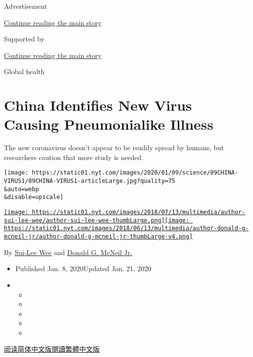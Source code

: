 Advertisement

\protect\hyperlink{after-top}{Continue reading the main story}

Supported by

\protect\hyperlink{after-sponsor}{Continue reading the main story}

Global health

\hypertarget{china-identifies-new-virus-causing-pneumonialike-illness}{%
\section{China Identifies New Virus Causing Pneumonialike
Illness}\label{china-identifies-new-virus-causing-pneumonialike-illness}}

The new coronavirus doesn't appear to be readily spread by humans, but
researchers caution that more study is needed.

\texttt{[image: https://static01.nyt.com/images/2020/01/09/science/09CHINA-VIRUS1/09CHINA-VIRUS1-articleLarge.jpg?quality=75\\\&auto=webp\\\&disable=upscale]}

\href{https://www.nytimes.com/by/sui-lee-wee}{\texttt{[image: https://static01.nyt.com/images/2018/07/13/multimedia/author-sui-lee-wee/author-sui-lee-wee-thumbLarge.png]}}\href{https://www.nytimes.com/by/donald-g-mcneil-jr}{\texttt{[image: https://static01.nyt.com/images/2018/06/13/multimedia/author-donald-g-mcneil-jr/author-donald-g-mcneil-jr-thumbLarge-v4.png]}}

By \href{https://www.nytimes.com/by/sui-lee-wee}{Sui-Lee Wee} and
\href{https://www.nytimes.com/by/donald-g-mcneil-jr}{Donald G. McNeil
Jr.}

\begin{itemize}
\item
  Published Jan. 8, 2020Updated Jan. 21, 2020
\item
  \begin{itemize}
  \item
  \item
  \item
  \item
  \item
  \end{itemize}
\end{itemize}

\href{https://cn.nytimes.com/china/20200109/china-pneumonia-outbreak-virus/}{阅读简体中文版}\href{https://cn.nytimes.com/china/20200109/china-pneumonia-outbreak-virus/zh-hn}{閱讀繁體中文版}


